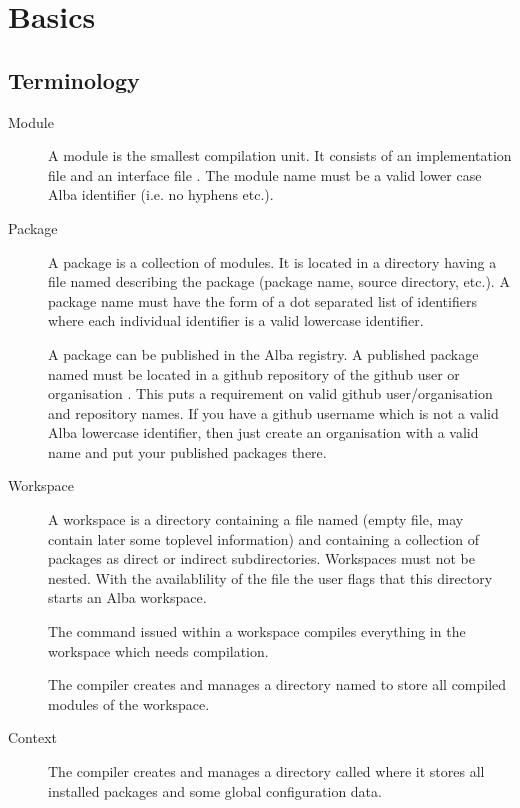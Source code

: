 \chapter{Basics}


\section{Terminology}

\begin{description}
\item[Module] A module is the smallest compilation unit. It consists of an
  implementation file  and an interface file
  . The module name must be a valid lower case Alba
  identifier (i.e. no hyphens etc.).

\item[Package] A package is a collection of modules. It is located in a
  directory having a file named  describing the
  package (package name, source directory, etc.). A package name must have the
  form of a dot separated list of identifiers  where each
  individual identifier is a valid lowercase identifier.

  A package can be published in the Alba registry. A published package named
   must be located in a github repository  of the
  github user or organisation . This puts a requirement on valid
  github user/organisation and repository names. If you have a github username
  which is not a valid Alba lowercase identifier, then just create an
  organisation with a valid name and put your published packages there.

\item[Workspace] A workspace is a directory containing a file named
   (empty file, may contain later some toplevel
  information) and containing a collection of packages as direct or indirect
  subdirectories. Workspaces must not be nested. With the availablility of the
  file  the user flags that this directory starts an
  Alba workspace.

  The command  issued within a workspace compiles
  everything in the workspace which needs compilation.

  The compiler creates and manages a directory named  to
  store all compiled modules of the workspace.

\item[Context] The compiler creates and manages a directory called
   where it stores all installed packages and some global
  configuration data.

\end{description}


